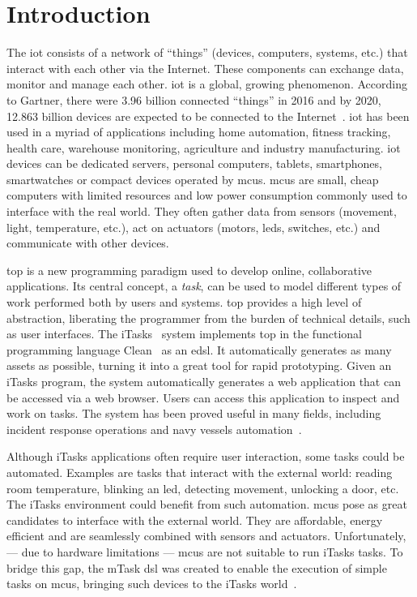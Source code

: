 \section{Introduction}
The \ac{iot} consists of a network of ``things'' (devices, computers, systems, etc.) that interact with each other via the Internet. These components can exchange data, monitor and manage each other. \ac{iot} is a global, growing phenomenon. According to Gartner, there were 3.96 billion connected ``things'' in 2016 and by 2020, 12.863 billion devices are expected to be connected to the Internet~\cite{iot_numbers}. \ac{iot} has been used in a myriad of applications including home automation, fitness tracking, health care, warehouse monitoring, agriculture and industry manufacturing. \ac{iot} devices can be dedicated servers, personal computers, tablets, smartphones, smartwatches or compact devices operated by \glspl{mcu}. \Glspl{mcu} are small, cheap computers with limited resources and low power consumption commonly used to interface with the real world. They often gather data from sensors (movement, light, temperature, etc.), act on actuators (motors, \acsp{led}, switches, etc.) and communicate with other devices.

\ac{top} is a new programming paradigm used to develop online, collaborative applications. Its central concept, a \textit{task}, can be used to model different types of work performed both by users and systems. \ac{top} provides a high level of abstraction, liberating the programmer from the burden of technical details, such as user interfaces. The iTasks~\cite{top} system implements \ac{top} in the functional programming language Clean~\cite{clean} as an \ac{edsl}. It automatically generates as many assets as possible, turning it into a great tool for rapid prototyping. Given an iTasks program, the system automatically generates a web application that can be accessed via a web browser. Users can access this application to inspect and work on tasks. The system has been proved useful in many fields, including incident response operations and navy vessels automation~\cite{incidone,navy}.

Although iTasks applications often require user interaction, some tasks could be automated. Examples are tasks that interact with the external world: reading room temperature, blinking an \acs{led}, detecting movement, unlocking a door,  etc. The iTasks environment could benefit from such automation. \Glspl{mcu} pose as great candidates to interface with the external world. They are affordable, energy efficient and are seamlessly combined with sensors and actuators. Unfortunately, --- due to hardware limitations --- \glspl{mcu} are not suitable to run iTasks tasks. To bridge this gap, the \gls{mTask} \ac{dsl} was created to enable the execution of simple tasks on \glspl{mcu}, bringing such devices to the \gls{iTasks} world~\cite{mtasks}.


